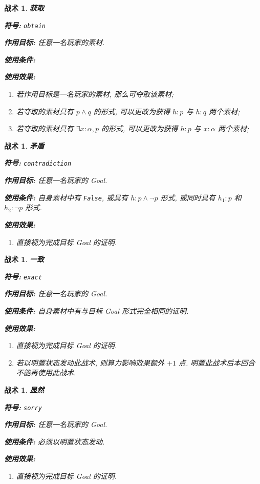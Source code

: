 \documentclass[UTF8]{ctexart}
\DeclareMathOperator{\0}{\mathbf{0}}                    %
\newcommand{\<}{\langle}
\renewcommand{\>}{\rangle}                              %
\newenvironment{thm_box}{
    \begin{tcolorbox}[enhanced, colback=thm_blue2, boxrule=0pt, frame hidden,
        borderline west={0.7mm}{0.1mm}{thm_blue1},breakable]
    }
    {\end{tcolorbox}}
\theoremstyle{MyStyle} %
\newtheorem{mytactic}[definition]{战术}
\newenvironment{tactic}[4]
{
    \begin{thm_box}
        \begin{mytactic}
            \textbf{#1}

            \textbf{符号: }#2

            \textbf{作用目标: }#3

            \textbf{使用条件: }#4

            \textbf{使用效果: }
}
{
        \end{mytactic}
    \end{thm_box}
}
\newcommand*{\lean}[1]{\texttt{\color{blue}#1}}
\begin{document}
        \begin{tactic}
            {获取}
            {\lean{obtain}}
            {任意一名玩家的素材. }
            {}
            \begin{enumerate}
                \item 若作用目标是一名玩家的素材, 那么可夺取该素材; 
                \item 若夺取的素材具有 $p \land q$ 的形式, 可以更改为获得 $h : p$ 与 $h : q$ 两个素材; 
                \item 若夺取的素材具有 $\exists x : \alpha, p$ 的形式, 可以更改为获得 $h : p$ 与 $x : \alpha$ 两个素材; 
            \end{enumerate}
        \end{tactic}

        \begin{tactic}
            {矛盾}
            {\lean{contradiction}}
            {任意一名玩家的 Goal. }
            {自身素材中有 \lean{False}, 或具有 $h : p\land\neg p$ 形式, 或同时具有 $h_1 : p$ 和 $h_2 : \neg p$ 形式. }
            \begin{enumerate}
                \item 直接视为完成目标 Goal 的证明. 
            \end{enumerate}
        \end{tactic}

        \begin{tactic}
            {一致}
            {\lean{exact}}
            {任意一名玩家的 Goal. }
            {自身素材中有与目标 Goal 形式完全相同的证明. }
            \begin{enumerate}
                \item 直接视为完成目标 Goal 的证明. 
                \item 若以明置状态发动此战术, 则算力影响效果额外 $+1$ 点. 明置此战术后本回合不能再使用此战术. 
            \end{enumerate}
        \end{tactic}

        \begin{tactic}
            {显然}
            {\texttt{\color{red}sorry}}
            {任意一名玩家的 Goal. }
            {必须以明置状态发动. }
            \begin{enumerate}
                \item 直接视为完成目标 Goal 的证明. 
            \end{enumerate}
        \end{tactic}
\end{document}
